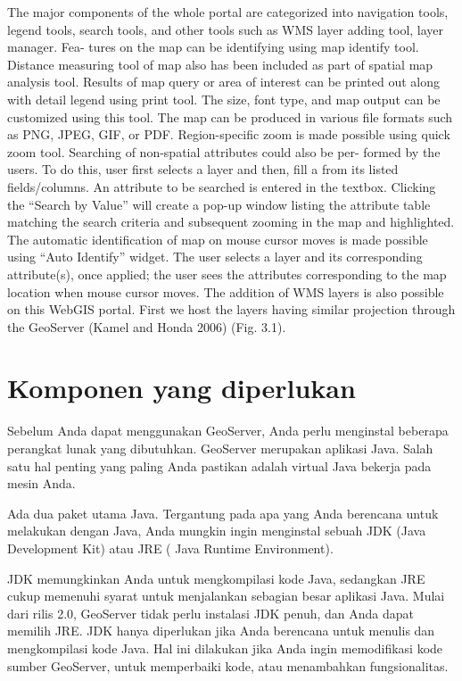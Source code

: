 \documentclass[]{book}
\begin{document}
The major components of the whole portal are categorized
into navigation tools, legend tools, search tools, and other
tools such as WMS layer adding tool, layer manager. Fea-
tures on the map can be identifying using map identify tool.
Distance measuring tool of map also has been included as
part of spatial map analysis tool. Results of map query or
area of interest can be printed out along with detail legend
using print tool. The size, font type, and map output can be
customized using this tool. The map can be produced in
various file formats such as PNG, JPEG, GIF, or PDF.
Region-specific zoom is made possible using quick zoom
tool.
Searching of non-spatial attributes could also be per-
formed by the users. To do this, user first selects a layer and
then, fill a from its listed fields/columns. An attribute to be
searched is entered in the textbox. Clicking the ``Search by
Value'' will create a pop-up window listing the attribute table
matching the search criteria and subsequent zooming in the
map and highlighted.
The automatic identification of map on mouse cursor
moves is made possible using ``Auto Identify'' widget. The
user selects a layer and its corresponding attribute(s), once
applied; the user sees the attributes corresponding to the map
location when mouse cursor moves.
The addition of WMS layers is also possible on this
WebGIS portal. First we host the layers having similar
projection through the GeoServer (Kamel and Honda 2006)
(Fig. 3.1).

\hypertarget{komponen-yang-diperlukan}{%
\section{Komponen yang diperlukan}\label{komponen-yang-diperlukan}}

Sebelum Anda dapat menggunakan GeoServer, Anda perlu menginstal beberapa perangkat lunak yang dibutuhkan. GeoServer merupakan aplikasi Java. Salah satu hal penting yang paling
Anda pastikan adalah virtual Java bekerja pada mesin Anda.

Ada dua paket utama Java. Tergantung pada apa yang Anda berencana untuk melakukan dengan Java, Anda mungkin
ingin menginstal sebuah JDK (Java Development Kit) atau JRE
( Java Runtime Environment).

JDK memungkinkan Anda untuk mengkompilasi kode Java, sedangkan JRE cukup memenuhi syarat
untuk menjalankan sebagian besar aplikasi Java. Mulai dari rilis 2.0, GeoServer tidak perlu instalasi JDK penuh, dan Anda
dapat memilih JRE. JDK hanya diperlukan jika Anda berencana untuk menulis dan mengkompilasi kode
Java. Hal ini dilakukan jika Anda ingin memodifikasi kode sumber GeoServer, untuk memperbaiki kode, atau menambahkan
fungsionalitas.
\end{document}
